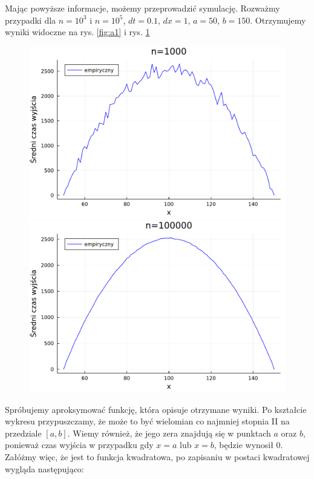 \documentclass{article}
\theoremstyle{break}
\numberwithin{equation}{subsection}
\numberwithin{figure}{section}
\begin{document}
Mając powyższe informacje, możemy przeprowadzić symulację. Rozważmy przypadki dla $n=10^3$ i $n=10^5$, $dt=0.1$, $dx=1$, $a=50$, $b=150$. Otrzymujemy wyniki widoczne na rys. \ref{fig:a1} i rys. \ref{fig:a2}
\begin{figure}[H]
	\begin{multicols}{2}
	\begin{center}
	\includegraphics[scale=0.30]{time100.pdf}
	\caption{}
	\label{fig:a1}
	\includegraphics[scale=0.30]{time100000.pdf}
	\caption{}
	\label{fig:a2}
	\end{center}
	\end{multicols}
\end{figure}
Spróbujemy aproksymować funkcję, która opisuje otrzymane wyniki. Po kształcie wykresu przypuszczamy, że może to być wielomian co najmniej stopnia II na przedziale $[a,b]$. Wiemy również, że jego zera znajdują się w punktach $a$ oraz $b$, ponieważ czas wyjścia w przypadku gdy $x=a$ lub $x=b$, będzie wynosił 0. Załóżmy więc, że jest to funkcja kwadratowa, po zapisaniu w postaci kwadratowej wygląda następująco:
\end{document}
